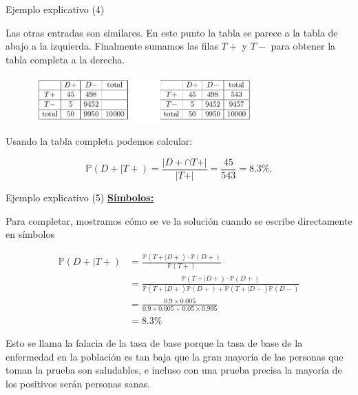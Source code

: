 \documentclass[10pt]{beamer}
\begin{document}
\begin{frame}{Ejemplo explicativo (4)}
\small{Las otras entradas son similares. En este punto la tabla se parece a la tabla de abajo a la izquierda. Finalmente sumamos las filas $T+$ y $T-$ para obtener la tabla completa a la derecha.

\begin{figure}[h]
	\centering
	\includegraphics[width=8.5cm]{g9}
\end{figure}

Usando la tabla completa podemos calcular:

\[
\mathbb{P}(D+|T +) = \frac{\vert D+ \cap T+\vert }{\vert T+ \vert} = \frac{45}{543} = 8.3\%.
\]
}
\end{frame}
\begin{frame}{Ejemplo explicativo (5)}
\small\underline{\textbf{S\'imbolos:}}{ Para completar, mostramos c\'omo se ve la soluci\'on cuando se escribe directamente en s\'imbolos

\begin{align*}
\mathbb{P}(D+|T +)  &=  \frac{\mathbb{P}(T+|D +)\cdot \mathbb{P}(D+ )}{\mathbb{P}(T+)} \\
					&= \frac{\mathbb{P}(T+|D +)\cdot \mathbb{P}(D+ )}{\mathbb{P}(T+|D+)\mathbb{P}(D+)+ \mathbb{P}(T+|D-)\mathbb{P}(D-)}\\
					&= \frac{0.9 \times 0.005}{0.9 \times 0.005 + 0.05 \times 0.995}\\
					&= 8.3\%
\end{align*}	
}

\scriptsize{Esto se llama la falacia de la tasa de base porque la tasa de base de la enfermedad en la poblaci\'on es tan baja que la gran mayor\'ia de las personas que toman la prueba son saludables, e incluso con una prueba precisa la mayor\'ia de los positivos ser\'an personas sanas.}	
\end{frame}
\end{document}
